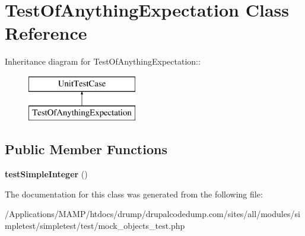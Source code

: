 \hypertarget{class_test_of_anything_expectation}{
\section{TestOfAnythingExpectation Class Reference}
\label{class_test_of_anything_expectation}
}
Inheritance diagram for TestOfAnythingExpectation::\begin{figure}[H]
\begin{center}
\leavevmode
\includegraphics[height=2cm]{class_test_of_anything_expectation}
\end{center}
\end{figure}
\subsection*{Public Member Functions}
\begin{DoxyCompactItemize}
\item 
\hypertarget{class_test_of_anything_expectation_aa5c7d07845b2b830ce0bfdaf50aef14a}{
{\bfseries testSimpleInteger} ()}
\label{class_test_of_anything_expectation_aa5c7d07845b2b830ce0bfdaf50aef14a}

\end{DoxyCompactItemize}


The documentation for this class was generated from the following file:\begin{DoxyCompactItemize}
\item 
/Applications/MAMP/htdocs/drump/drupalcodedump.com/sites/all/modules/simpletest/simpletest/test/mock\_\-objects\_\-test.php\end{DoxyCompactItemize}
